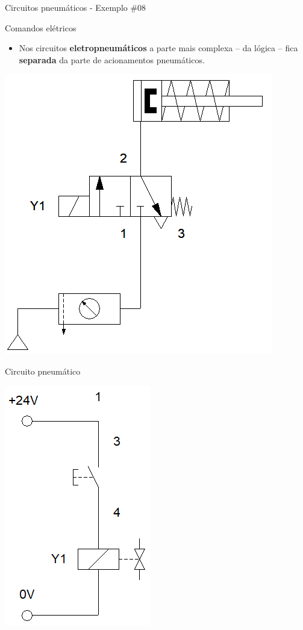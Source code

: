 \begin{frame}{Circuitos pneumáticos - Exemplo \#08}
	\begin{block}{Comandos elétricos}
		\begin{itemize}
			\item Nos circuitos \textbf{eletropneumáticos} a parte mais complexa -- da lógica -- fica \textbf{separada} da parte de acionamentos pneumáticos.
		\end{itemize}
	\end{block}
	
	\medskip
	
	\begin{minipage}{0.48\linewidth}
		\centering
		\includegraphics[height=0.6\textheight]{Figuras/Ch14/fig49}
		\smallskip
		
		Circuito pneumático
	\end{minipage}
	\hfill
	\begin{minipage}{0.48\linewidth}
		\centering
		\includegraphics[height=0.6\textheight]{Figuras/Ch14/fig50}
		\smallskip
		

\end{minipage}
\end{frame}
